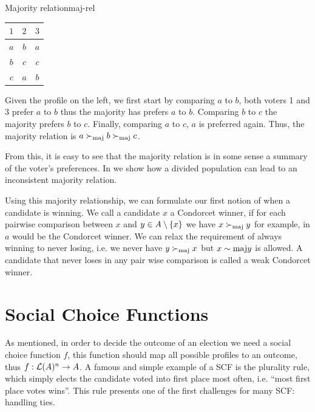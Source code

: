 \begin{example}{Majority relation}{maj-rel}
	\begin{minipage}{0.15\linewidth}
		\begin{tabular}{ccc}
			\toprule
			$1$ & $2$ & $3$ \\
			\midrule
			$a$ & $b$ & $a$ \\
			$b$ & $c$ & $c$ \\
			$c$ & $a$ & $b$ \\
			\bottomrule
		\end{tabular}
	\end{minipage}
	\hspace{0.02\linewidth}
	\begin{minipage}{0.78\linewidth}
		Given the profile on the left, we
		first start by comparing $a$ to $b$, both voters 1 and 3 prefer
		$a$ to $b$ thus the majority has prefers $a$ to $b$. Comparing
		$b$ to $c$ the majority prefers $b$ to $c$. Finally, comparing
		$a$ to $c$, $a$ is preferred again. Thus, the majority relation
		is $a \succ_{\textnormal{maj}} b \succ_{\textnormal{maj}} c$.
	\end{minipage}
\end{example}

From this, it is easy to see that the majority relation is in some sense a
summary of the voter's preferences. In 
we show how a divided population can lead to an inconsistent majority relation.

Using this majority relationship, we can formulate our first notion of when a
candidate is winning. We call a candidate $x$ a Condorcet winner, if for
each pairwise comparison between $x$ and $y \in A\setminus
	\{x\}$ we have $x \succ_{\textnormal{maj}} y$ for example, in  $a$ would be
the Condorcet winner. We can relax the requirement of always winning to never
losing, i.e. we never have $y \succ_{\textnormal{maj}} x$ but $x \sim{\textnormal{maj}} y$ is allowed. A
candidate that never loses in any pair wise comparison is called a weak
Condorcet winner.

\section{Social Choice Functions} \label{sec:SCF}

As mentioned, in order to decide the outcome of an election we need a social
choice function $f$, this function should map all possible profiles to an
outcome, thus $f: \mathcal{L}(A)^n \to A$. A famous and
simple example of a SCF is the plurality rule, which simply elects the
candidate voted into first place most often, i.e. ``most first place votes
wins''. This rule presents one of the first challenges for many SCF: handling ties.

